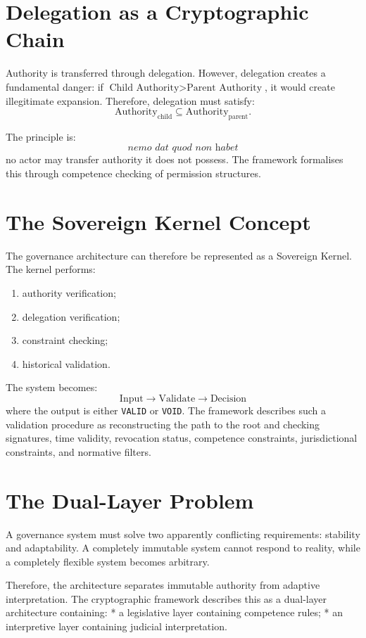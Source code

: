 \documentclass[11pt,openany]{book}
\theoremstyle{plain}
\theoremstyle{definition}
\begin{document}
\section*{Delegation as a Cryptographic Chain}

Authority is transferred through delegation. However, delegation creates a fundamental danger: if \(\text{Child Authority} > \text{Parent Authority}\), it would create illegitimate expansion. Therefore, delegation must satisfy:
\[
\text{Authority}_{\text{child}} \subseteq \text{Authority}_{\text{parent}}.
\]

The principle is:
\[
\boxed{
\textit{nemo dat quod non habet}
}
\]
no actor may transfer authority it does not possess. The framework formalises this through competence checking of permission structures.

\section*{The Sovereign Kernel Concept}

The governance architecture can therefore be represented as a Sovereign Kernel. The kernel performs:
\begin{enumerate}
\item authority verification;
\item delegation verification;
\item constraint checking;
\item historical validation.
\end{enumerate}

The system becomes:
\[
\text{Input} \longrightarrow \text{Validate} \longrightarrow \text{Decision}
\]
where the output is either \texttt{VALID} or \texttt{VOID}. The framework describes such a validation procedure as reconstructing the path to the root and checking signatures, time validity, revocation status, competence constraints, jurisdictional constraints, and normative filters.

\section*{The Dual-Layer Problem}

A governance system must solve two apparently conflicting requirements: stability and adaptability. A completely immutable system cannot respond to reality, while a completely flexible system becomes arbitrary. 

Therefore, the architecture separates immutable authority from adaptive interpretation. The cryptographic framework describes this as a dual-layer architecture containing:
* a legislative layer containing competence rules;
* an interpretive layer containing judicial interpretation.
\end{document}
